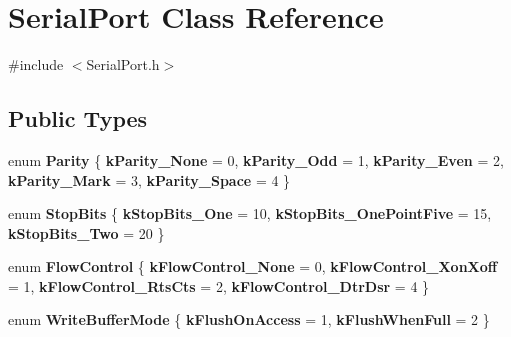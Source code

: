 \hypertarget{classSerialPort}{\section{\-Serial\-Port \-Class \-Reference}
\label{classSerialPort}
}


{\ttfamily \#include $<$\-Serial\-Port.\-h$>$}

\subsection*{\-Public \-Types}
\begin{DoxyCompactItemize}
\item 
enum {\bfseries \-Parity} \{ \*
{\bfseries k\-Parity\-\_\-\-None} = 0, 
{\bfseries k\-Parity\-\_\-\-Odd} = 1, 
{\bfseries k\-Parity\-\_\-\-Even} = 2, 
{\bfseries k\-Parity\-\_\-\-Mark} = 3, 
\*
{\bfseries k\-Parity\-\_\-\-Space} = 4
 \}
\item 
enum {\bfseries \-Stop\-Bits} \{ {\bfseries k\-Stop\-Bits\-\_\-\-One} = 10, 
{\bfseries k\-Stop\-Bits\-\_\-\-One\-Point\-Five} = 15, 
{\bfseries k\-Stop\-Bits\-\_\-\-Two} = 20
 \}
\item 
enum {\bfseries \-Flow\-Control} \{ {\bfseries k\-Flow\-Control\-\_\-\-None} = 0, 
{\bfseries k\-Flow\-Control\-\_\-\-Xon\-Xoff} = 1, 
{\bfseries k\-Flow\-Control\-\_\-\-Rts\-Cts} = 2, 
{\bfseries k\-Flow\-Control\-\_\-\-Dtr\-Dsr} = 4
 \}
\item 
enum {\bfseries \-Write\-Buffer\-Mode} \{ {\bfseries k\-Flush\-On\-Access} = 1, 
{\bfseries k\-Flush\-When\-Full} = 2
 \}
\end{DoxyCompactItemize}
